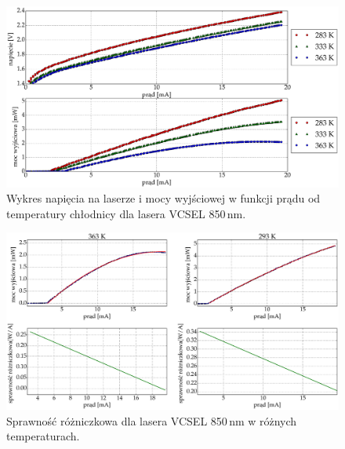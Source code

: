 \begin{figure}
\center
  \includegraphics[scale=0.30]{plot_vcsel_850/plot_power_voltage.eps}
  \caption{Wykres napięcia na laserze i mocy wyjściowej w funkcji prądu od temperatury chłodnicy dla lasera VCSEL 850\,nm.}
  \label{fig:plot_power_voltage_vcsel850}
\end{figure}
\begin{figure}
\center
  \includegraphics[scale=0.30]{plot_vcsel_850/plot_eff_all_via_current2.eps}
  \caption{Sprawność różniczkowa dla lasera VCSEL 850\,nm w różnych temperaturach.}
  \label{fig:plot_eff_all_via_current2_vcsel850}
\end{figure}

